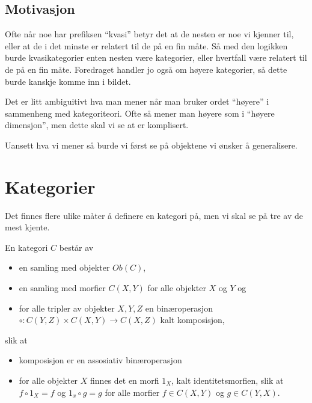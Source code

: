 
\subsection{Motivasjon}

Ofte når noe har prefiksen ``kvasi'' betyr det at de nesten er noe vi kjenner til, eller at de i det minste er relatert til de på en fin måte. 
Så med den logikken burde kvasikategorier enten nesten være kategorier, eller hvertfall være relatert til de på en fin måte. 
Foredraget handler jo også om høyere kategorier, så dette burde kanskje komme inn i bildet. 

Det er litt ambiguitivt hva man mener når man bruker ordet ``høyere'' i sammenheng med kategoriteori. 
Ofte så mener man høyere som i ``høyere dimensjon'', men dette skal vi se at er komplisert. 

Uansett hva vi mener så burde vi først se på objektene vi ønsker å generalisere.

\section{Kategorier}

Det finnes flere ulike måter å definere en kategori på, men vi skal se på tre av de mest kjente. 

\begin{definition}
    En kategori $C$ består av
    \begin{itemize}
        \item en samling med objekter $Ob(C)$,
        \item en samling med morfier $C(X,Y)$ for alle objekter $X$ og $Y$ og
        \item for alle tripler av objekter $X, Y, Z$ en binæroperasjon $\circ : C(Y, Z)\times C(X, Y) \longrightarrow C(X, Z)$ kalt komposisjon,
    \end{itemize}
    slik at
    \begin{itemize}
        \item komposisjon er en assosiativ binæroperasjon
        \item for alle objekter $X$ finnes det en morfi $1_X$, kalt identitetsmorfien, slik at $f \circ 1_X = f$ og $1_x\circ g = g$ for alle morfier $f\in C(X, Y)$ og $g\in C(Y,X)$. 
    \end{itemize}
\end{definition}

